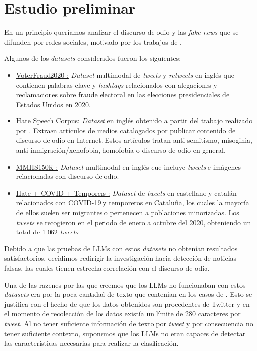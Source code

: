 \section{Estudio preliminar}

En un principio queríamos analizar el discurso de odio y las \emph{fake news} que se difunden por redes sociales, motivado por los trabajos de \citet{Gomez2019,Toraman2022}.

Algunos de los \textit{datasets} considerados fueron los siguientes:
\begin{itemize}
    \item \underline{VoterFraud2020 \citep{Abilov2021}:} \textit{Dataset} multimodal de \emph{tweets} y \emph{retweets} en inglés que contienen palabras clave y \emph{hashtags} relacionados con alegaciones y reclamaciones sobre fraude electoral en las elecciones presidenciales de Estados Unidos en 2020.
    \item \underline{Hate Speech Corpus:} \textit{Dataset} en inglés obtenido a partir del trabajo realizado por \citet{Szpakowski2017}. Extraen artículos de medios catalogados por publicar contenido de discurso de odio en Internet. Estos artículos tratan anti-semitismo, misoginia, anti-inmigración/xenofobia, homofobia o discurso de odio en general.
    \item \underline{MMHS150K \citep{Gomez2019}:} \textit{Dataset} multimodal en inglés que incluye \emph{tweets} e imágenes relacionadas con discurso de odio.
    \item \underline{Hate + COVID + Temporers \citep{Rodriguez2022}:} \textit{Dataset} de \textit{tweets} en castellano y catalán relacionados con COVID-19 y temporeros en Cataluña, los cuales la mayoría de ellos suelen ser migrantes o pertenecen a poblaciones minorizadas. Los \textit{tweets} se recogieron en el periodo de enero a octubre del 2020, obteniendo un total de 1.062 \textit{tweets}.
\end{itemize}

Debido a que las pruebas de LLMs con estos \textit{datasets} no obtenían resultados satisfactorios, decidimos redirigir la investigación hacia detección de noticias falsas, las cuales tienen estrecha correlación con el discurso de odio. 

Una de las razones por las que creemos que los LLMs no funcionaban con estos \textit{datasets} era por la poca cantidad de texto que contenían en los casos de \citet{Abilov2021,Gomez2019,Rodriguez2022}. Esto se justifica con el hecho de que los datos obtenidos son procedentes de Twitter y en el momento de recolección de los datos existía un límite de 280 caracteres por \emph{tweet}. Al no tener suficiente información de texto por \textit{tweet} y por consecuencia no tener suficiente contexto, suponemos que los LLMs no eran capaces de detectar las características necesarias para realizar la clasificación.

